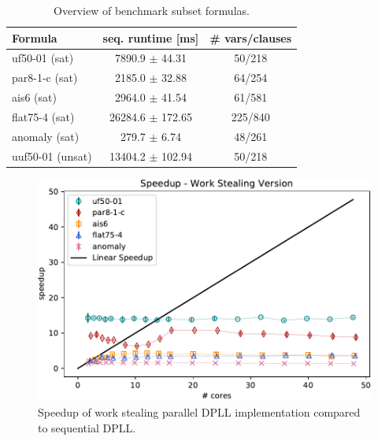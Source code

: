 \documentclass[letterpaper]{article}
\begin{document}
\begin{table}
    \centering
    \begin{tabular}{|l|c|c|}
        \hline
        Formula & seq. runtime [ms] & \# vars/clauses \\
        \hline
        \hline
        uf50-01 (sat) & 7890.9 $\pm$ 44.31 & 50/218\\
        \hline
        par8-1-c (sat) & 2185.0 $\pm$ 32.88 & 64/254\\
        \hline
        ais6 (sat) &  2964.0 $\pm$ 41.54 & 61/581\\
        \hline
        flat75-4 (sat) & 26284.6 $\pm$ 172.65 & 225/840\\
        \hline
        anomaly (sat) & 279.7 $\pm$ 6.74 & 48/261\\
        \hline
        uuf50-01 (unsat) & 13404.2 $\pm$ 102.94 & 50/218\\
        \hline
    \end{tabular}
    \caption{Overview of benchmark subset formulas.}
    \label{tab:cnfs_representatives}
\end{table}

\begin{figure}
	\centering
	\includegraphics[width=\columnwidth]{figures/scaling_stealing_subset_dpll_scaling_tar.pdf}
	\caption{Speedup of work stealing parallel DPLL implementation compared to sequential DPLL.
		\label{fig:dpll_stealing_speedup}}
\end{figure}
\end{document}
